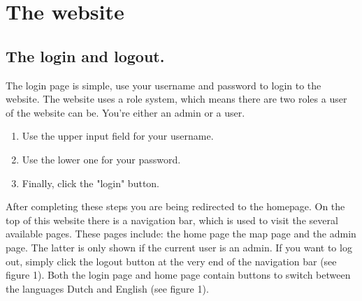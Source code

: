\documentclass[a4paper]{article}
\begin{document}
\newpage
\section{The website}
\subsection{The login and logout.}
The login page is simple, use your username and password to login to the website. The website uses a role system, which means there are two roles a user of the website can be. You're either an admin or a user. 

\begin{enumerate}[]
	\item Use the upper input field for your username.
	\item Use the lower one for your password.
	\item Finally, click the "login" button.
\end{enumerate}
\noindent
After completing these steps you are being redirected to the homepage.
\newline
\newline
On the top of this website there is a navigation bar, which is used to visit the several available pages. These pages include: the home page the map page and the admin page. The latter is only shown if the current user is an admin.
\newline
\newline
If you want to log out, simply click the logout button at the very end of the navigation bar (see figure 1).
\newline
\newline
Both the login page and home page contain buttons to switch between the languages Dutch and English (see figure 1).
\newline
\end{document}
